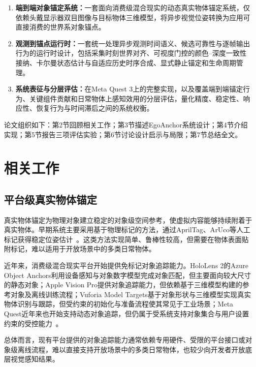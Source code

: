 \documentclass[review]{vgtc}
\begin{document}
\begin{enumerate}
  \item \textbf{端到端对象锚定系统：}一套面向消费级混合现实的动态真实物体锚定系统，仅依赖头戴显示器双目图像与目标物体三维模型，将异步视觉位姿转换为应用可直接消费的世界系对象锚点。
  \item \textbf{观测到锚点运行时：}一套统一处理异步观测时间语义、候选可靠性与逐帧输出行为的运行时设计，包括采集时刻世界对齐、可视度门控的颜色--深度一致性接纳、卡尔曼状态估计与自适应历史时序合成、显式静止锚定和生命周期管理。
  \item \textbf{系统表征与分层评估：}在Meta Quest 3上的完整实现，以及覆盖端到端锚定行为、关键组件贡献和日常物体上感知效用的分层评估，量化精度、稳定性、响应性、恢复行为与时间滞后之间的系统权衡。
\end{enumerate}

论文组织如下：第2节回顾相关工作；第3节描述EgoAnchor系统设计；第4节介绍实现；第5节报告三项评估实验；第6节讨论设计启示与局限；第7节总结全文。

\section{相关工作}\label{sec:related-work}

\subsection{平台级真实物体锚定}

真实物体锚定为物理对象建立稳定的对象级空间参考，使虚拟内容能够持续附着于真实物体。早期系统主要采用基于物理标记的方法，通过AprilTag、ArUco等人工标记获得稳定位姿估计~\cite{kato1999artoolkit,olson2011apriltag,garridojurado2014aruco}。这类方法实现简单、鲁棒性较高，但需要在物体表面贴附标记，难以适用于开放场景中的多类日常物体。

近年来，消费级混合现实平台开始提供免标记对象追踪能力。HoloLens 2的Azure Object Anchors利用设备感知与对象数字模型完成对象匹配，但主要面向较大尺寸的静态对象；Apple Vision Pro提供对象追踪能力，但依赖基于三维模型构建的参考对象及离线训练流程；Vuforia Model Targets基于对象形状与三维模型实现真实物体识别与跟踪，但受约束的初始化与准备流程使其常见于工业场景；Meta Quest近年来也开始支持动态对象追踪，但仍属于受系统支持对象集合与用户设置约束的受控能力~\cite{appleObjectAnchor,azureObjectAnchors,vuforiaModelTargets,metaDynamicObjectTracker}。

总体而言，现有平台提供的对象追踪能力通常依赖专用硬件、受限的平台接口或对象级离线流程，难以直接支持开放场景中的多类日常物体，也较少向开发者开放底层视觉感知结果。
\end{document}
